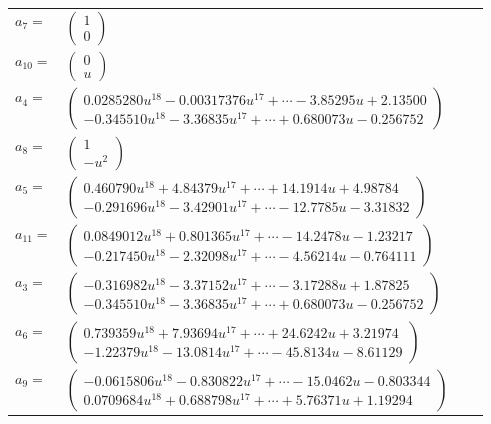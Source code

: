 \documentclass[1p]{elsarticle_modified}
\theoremstyle{definition}
\begin{document}
\begin{tabular}{m{7pt} m{180pt} m{7pt} m{180pt} }
\flushright $a_{7}=$&$\begin{pmatrix}1\\0\end{pmatrix}$ \\
\flushright $a_{10}=$&$\begin{pmatrix}0\\u\end{pmatrix}$ \\
\flushright $a_{4}=$&$\begin{pmatrix}0.0285280 u^{18}-0.00317376 u^{17}+\cdots-3.85295 u+2.13500\\-0.345510 u^{18}-3.36835 u^{17}+\cdots+0.680073 u-0.256752\end{pmatrix}$ \\
\flushright $a_{8}=$&$\begin{pmatrix}1\\- u^2\end{pmatrix}$ \\
\flushright $a_{5}=$&$\begin{pmatrix}0.460790 u^{18}+4.84379 u^{17}+\cdots+14.1914 u+4.98784\\-0.291696 u^{18}-3.42901 u^{17}+\cdots-12.7785 u-3.31832\end{pmatrix}$ \\
\flushright $a_{11}=$&$\begin{pmatrix}0.0849012 u^{18}+0.801365 u^{17}+\cdots-14.2478 u-1.23217\\-0.217450 u^{18}-2.32098 u^{17}+\cdots-4.56214 u-0.764111\end{pmatrix}$ \\
\flushright $a_{3}=$&$\begin{pmatrix}-0.316982 u^{18}-3.37152 u^{17}+\cdots-3.17288 u+1.87825\\-0.345510 u^{18}-3.36835 u^{17}+\cdots+0.680073 u-0.256752\end{pmatrix}$ \\
\flushright $a_{6}=$&$\begin{pmatrix}0.739359 u^{18}+7.93694 u^{17}+\cdots+24.6242 u+3.21974\\-1.22379 u^{18}-13.0814 u^{17}+\cdots-45.8134 u-8.61129\end{pmatrix}$ \\
\flushright $a_{9}=$&$\begin{pmatrix}-0.0615806 u^{18}-0.830822 u^{17}+\cdots-15.0462 u-0.803344\\0.0709684 u^{18}+0.688798 u^{17}+\cdots+5.76371 u+1.19294\end{pmatrix}$ \\

\end{tabular}
\end{document}
